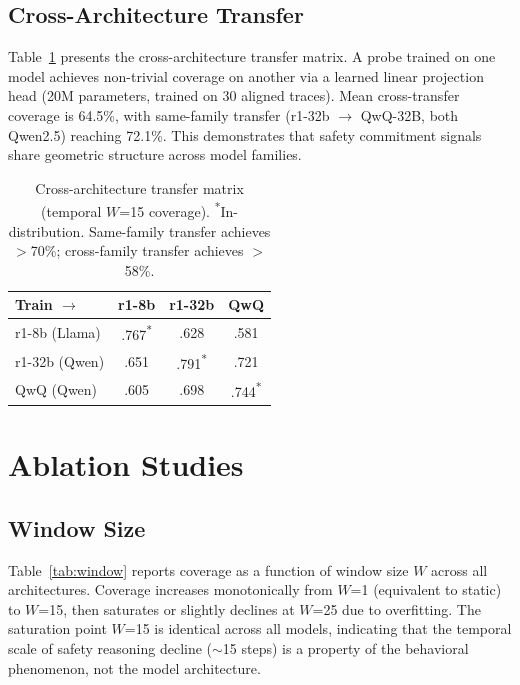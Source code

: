 \documentclass[11pt,a4paper]{article}
\begin{document}
\subsection{Cross-Architecture Transfer}

Table~\ref{tab:transfer} presents the cross-architecture transfer matrix.
A probe trained on one model achieves non-trivial coverage on another via a learned linear projection head (20M parameters, trained on 30 aligned traces).
Mean cross-transfer coverage is 64.5\%, with same-family transfer (r1-32b $\to$ QwQ-32B, both Qwen2.5) reaching 72.1\%.
This demonstrates that safety commitment signals share geometric structure across model families.

\begin{table}[t]
\centering
\small
\begin{tabular}{lccc}
\toprule
\textbf{Train $\to$} & \textbf{r1-8b} & \textbf{r1-32b} & \textbf{QwQ} \\
\midrule
r1-8b (Llama) & .767\textsuperscript{*} & .628 & .581 \\
r1-32b (Qwen) & .651 & .791\textsuperscript{*} & .721 \\
QwQ (Qwen) & .605 & .698 & .744\textsuperscript{*} \\
\bottomrule
\end{tabular}
\caption{Cross-architecture transfer matrix (temporal $W$=15 coverage). \textsuperscript{*}In-distribution. Same-family transfer achieves $>$70\%; cross-family transfer achieves $>$58\%.}
\label{tab:transfer}
\end{table}

\section{Ablation Studies}

\subsection{Window Size}

Table~\ref{tab:window} reports coverage as a function of window size $W$ across all architectures.
Coverage increases monotonically from $W$=1 (equivalent to static) to $W$=15, then saturates or slightly declines at $W$=25 due to overfitting.
The saturation point $W$=15 is identical across all models, indicating that the temporal scale of safety reasoning decline ($\sim$15 steps) is a property of the behavioral phenomenon, not the model architecture.
\end{document}

